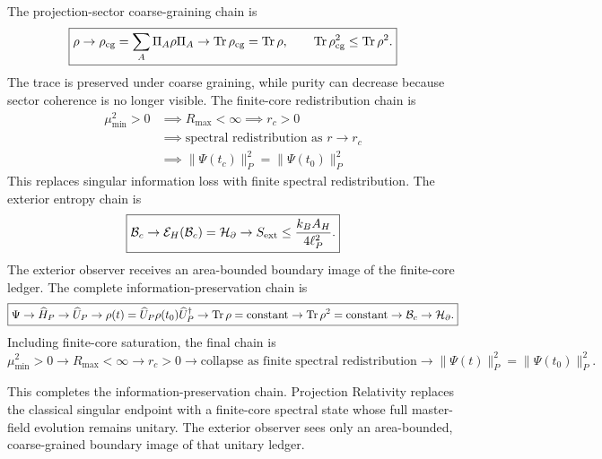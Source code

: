 \documentclass[11pt]{article}
\begin{document}
The projection-sector coarse-graining chain is
\begin{equation}
\boxed{
\rho
\rightarrow
\rho_{\rm cg}
=
\sum_A
\Pi_A\rho\Pi_A
\rightarrow
{\rm Tr}\,\rho_{\rm cg}
=
{\rm Tr}\,\rho,
\qquad
{\rm Tr}\,\rho_{\rm cg}^2
\leq
{\rm Tr}\,\rho^2.
}
\end{equation}
The trace is preserved under coarse graining, while purity can decrease because
sector coherence is no longer visible. The finite-core redistribution chain is
\begin{equation}
\boxed{
\begin{aligned}
\mu_{\min}^2 > 0 &\implies R_{\max} < \infty \implies r_c > 0 \\
&\implies \text{spectral redistribution as } r \to r_c \\
&\implies \|\Psi(t_c)\|_P^2 = \|\Psi(t_0)\|_P^2
\end{aligned}
}
\end{equation}
This replaces singular information loss with finite spectral redistribution. The exterior entropy chain is
\begin{equation}
\boxed{
\mathcal B_c
\rightarrow
\mathcal E_H(\mathcal B_c)
=
\mathcal H_\partial
\rightarrow
S_{\rm ext}
\leq
\frac{k_BA_H}{4\ell_P^2}.
}
\end{equation}
The exterior observer receives an area-bounded boundary image of the finite-core
ledger. The complete information-preservation chain is
\begin{equation}
\boxed{
\Psi
\rightarrow
\widehat H_P
\rightarrow
\widehat U_P
\rightarrow
\rho(t)
=
\widehat U_P\rho(t_0)\widehat U_P^\dagger
\rightarrow
{\rm Tr}\,\rho
=
{\rm constant}
\rightarrow
{\rm Tr}\,\rho^2
=
{\rm constant}
\rightarrow
\mathcal B_c
\rightarrow
\mathcal H_\partial.
}
\end{equation}
Including finite-core saturation, the final chain is
\begin{equation}
\boxed{
\mu_{\min}^2>0
\rightarrow
R_{\max}<\infty
\rightarrow
r_c>0
\rightarrow
\text{collapse as finite spectral redistribution}
\rightarrow
\|\Psi(t)\|_P^2
=
\|\Psi(t_0)\|_P^2.
}
\end{equation}

This completes the information-preservation chain. Projection Relativity
replaces the classical singular endpoint with a finite-core spectral state whose
full master-field evolution remains unitary. The exterior observer sees only an
area-bounded, coarse-grained boundary image of that unitary ledger.
\end{document}
